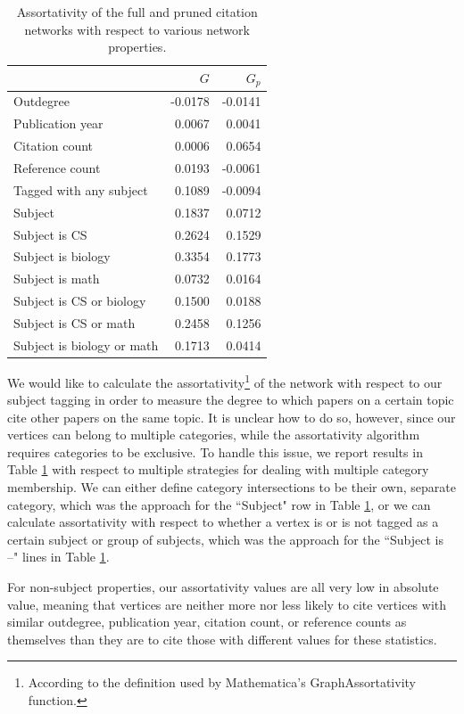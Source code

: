 \documentclass[12pt]{thesis}
\theoremstyle{plain}
\theoremstyle{definition}
\theoremstyle{remark}
\begin{document}
\begin{table}[h]
\centering
\setlength\extrarowheight{3pt}
\begin{tabular}{|l|r|r|}
\hline
 & $G$ & $G_p$ \\ \hline\hline
Outdegree & -0.0178 & -0.0141 \\ \hline
Publication year & 0.0067 & 0.0041 \\ \hline
Citation count & 0.0006 & 0.0654 \\ \hline
Reference count & 0.0193 & -0.0061 \\ \hline
Tagged with any subject & 0.1089 & -0.0094 \\ \hline
Subject & 0.1837 & 0.0712 \\ \hline
Subject is CS & 0.2624 & 0.1529 \\ \hline
Subject is biology & 0.3354 & 0.1773 \\ \hline
Subject is math & 0.0732 & 0.0164 \\ \hline
Subject is CS or biology & 0.1500 & 0.0188 \\ \hline
Subject is CS or math & 0.2458 & 0.1256 \\ \hline
Subject is biology or math & 0.1713 & 0.0414 \\ \hline
\end{tabular}
\caption{Assortativity of the full and pruned citation networks with respect to various network properties.}
\label{tab:assortativity}
\end{table}

We would like to calculate the assortativity\footnote{According to the definition used by Mathematica's GraphAssortativity function.} of the network with respect to our subject tagging in order to measure the degree to which papers on a certain topic cite other papers on the same topic. It is unclear how to do so, however, since our vertices can belong to multiple categories, while the assortativity algorithm requires categories to be exclusive. To handle this issue, we report results in Table \ref{tab:assortativity} with respect to multiple strategies for dealing with multiple category membership. We can either define category intersections to be their own, separate category, which was the approach for the ``Subject" row in Table \ref{tab:assortativity}, or we can calculate assortativity with respect to whether a vertex is or is not tagged as a certain subject or group of subjects, which was the approach for the ``Subject is --" lines in Table \ref{tab:assortativity}.

For non-subject properties, our assortativity values are all very low in absolute value, meaning that vertices are neither more nor less likely to cite vertices with similar outdegree, publication year, citation count, or reference counts as themselves than they are to cite those with different values for these statistics.
\end{document}
